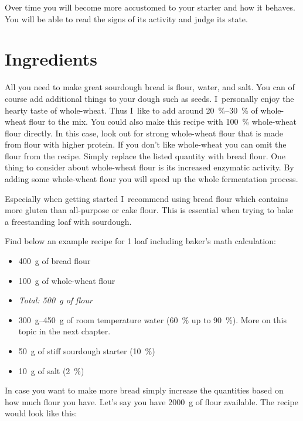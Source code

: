 Over time you will become more accustomed to your starter
and how it behaves. You will be able to read the signs of its
activity and judge its state.

\section{Ingredients}

All you need to make great sourdough bread is flour, water, and salt. You
can of course add additional things to your dough such as seeds. I~personally
enjoy the hearty taste of whole-wheat. Thus I~like to add around
\qtyrange{20}{30}{\percent} of whole-wheat flour to the mix. You could also
make this recipe with \qty{100}{\percent}
whole-wheat flour directly. In this case, look out for strong whole-wheat
flour that is made from flour with higher protein. If you don't like whole-wheat
you can omit the flour from the recipe. Simply replace the listed
quantity with bread flour. One thing to consider about whole-wheat
flour is its increased enzymatic activity. By adding some whole-wheat
flour you will speed up the whole fermentation process.

Especially when getting started I~recommend using bread flour which
contains more gluten than all-purpose or cake flour. This is essential
when trying to bake a freestanding loaf with sourdough.

Find below an example recipe for 1 loaf including baker's math calculation:

\begin{itemize}
  \item \qty{400}{\gram} of bread flour
  \item \qty{100}{\gram} of whole-wheat flour
  \item \emph{Total: 500~g of flour}
  \item \qtyrange{300}{450}{\gram} of room temperature water (\qty{60}{\percent} up to \qty{90}{\percent}). More on
this topic in the next chapter.
  \item \qty{50}{\gram} of stiff sourdough starter (\qty{10}{\percent})
  \item \qty{10}{\gram} of salt (\qty{2}{\percent})
\end{itemize}

In case you want to make more bread simply increase the quantities based on
how much flour you have. Let's say you have \qty{2000}{\gram} of flour available. The
recipe would look like this:

